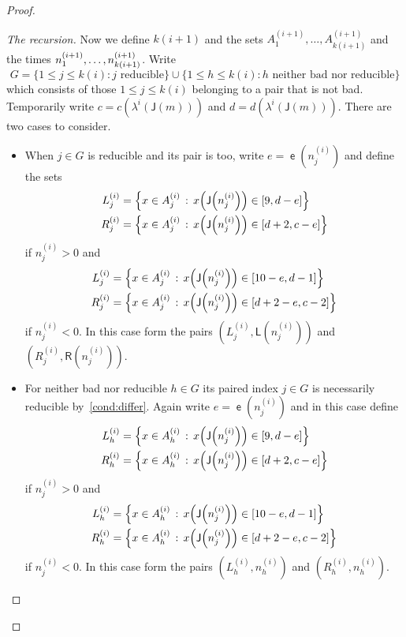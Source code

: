 \documentclass[AHL,Unicode,longabstracts,published]{cedram}
\DeclareMathOperator{\lst}{\mathsf{e}}
\newcommand{\lft}{\mathsf{L}}
\newcommand{\rht}{\mathsf{R}}
\newcommand{\scl}{\mathsf{J}}
\let\originalleft\left
\let\originalright\right
\renewcommand{\left}{\mathopen{}\mathclose\bgroup\originalleft}
\renewcommand{\right}{\aftergroup\egroup\originalright}
\begin{document}
\begin{proof}
\begin{proof}[{The recursion}]
Now we define $k(i+1)$ and the sets $A^{(i+1)}_1,\dots,A^{(i+1)}_{k(i+1)}$ and the times $n^{(i+1)}_1,\dots,\linebreak n^{(i+1)}_{k(i+1)}$. Write
\[
G = \{ 1 \le j \le k(i) : j \text{ reducible} \} \cup \{ 1 \le h \le k(i) : h \text{ neither bad nor reducible} \}
\]
which consists of those $1 \le j \le k(i)$ belonging to a pair that is not bad. Temporarily write $c = c(\lambda^i(\scl(m)))$ and $d = d(\lambda^i(\scl(m)))$. There are two cases to consider.
\begin{itemize}
\item When $j \in G$ is reducible and its pair is too, write $e = \lst(n^{(i)}_j)$ and define the sets
\begin{align*}
L^{(i)}_j &= \left\{ x \in A^{(i)}_j \,:\, x\left(\scl\left(n^{(i)}_j\right)\right) \in [9,d-e] \right\} \\
R^{(i)}_j &= \left\{ x \in A^{(i)}_j \,:\, x\left(\scl\left(n^{(i)}_j\right)\right) \in [d+2,c-e] \right\}
\end{align*}
if $n^{(i)}_j > 0$ and
\begin{align*}
L^{(i)}_j &= \left\{ x \in A^{(i)}_j \,:\, x\left(\scl\left(n^{(i)}_j\right)\right) \in [10-e,d-1] \right\} \\
R^{(i)}_j &= \left\{ x \in A^{(i)}_j \,:\, x\left(\scl\left(n^{(i)}_j\right)\right) \in [d+2-e,c-2] \right\}
\end{align*}
if $n^{(i)}_j < 0$. In this case form the pairs $(L^{(i)}_j, \lft(n^{(i)}_j))$ and $(R^{(i)}_j, \rht(n^{(i)}_j))$.
\item For neither bad nor reducible $h \in G$ its paired index $j \in G$ is necessarily reducible by~\eqref{cond:differ}. Again write $e = \lst(n^{(i)}_j)$ and in this case define
\begin{align*}
L^{(i)}_h &= \left\{ x \in A^{(i)}_h \,:\, x\left(\scl\left(n^{(i)}_j\right)\right) \in [9,d-e] \right\} \\
R^{(i)}_h &= \left\{ x \in A^{(i)}_h \,:\, x\left(\scl\left(n^{(i)}_j\right)\right) \in [d+2,c-e] \right\}
\end{align*}
if $n^{(i)}_j > 0$ and
\begin{align*}
L^{(i)}_h &= \left\{ x \in A^{(i)}_h \,:\, x\left(\scl\left(n^{(i)}_j\right)\right) \in [10-e,d-1] \right\} \\
R^{(i)}_h &= \left\{ x \in A^{(i)}_h \,:\, x\left(\scl\left(n^{(i)}_j\right)\right) \in [d+2-e,c-2] \right\}
\end{align*}
if $n^{(i)}_j < 0$. In this case form the pairs $(L^{(i)}_h, n^{(i)}_h)$ and $(R^{(i)}_h, n^{(i)}_h)$.
\end{itemize}


\end{proof}
\end{proof}
\end{document}

